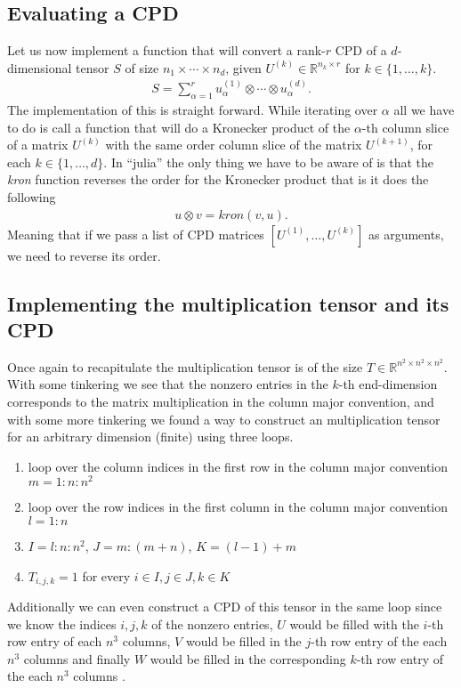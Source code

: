 \documentclass[a4paper]{article}
\begin{document}
\subsection{Evaluating a CPD}
Let us now implement a function that will convert a rank-$r$ CPD of a
$d$-dimensional tensor $S$ of size $n_1 \times \cdots \times n_d$, given
$U^{(k)} \in \mathbb{R}^{n_k\times r}$ for $k\in \{1, \dots, k\}$.
\begin{align}
    S = \sum_{\alpha=1}^r u_\alpha^{(1)} \otimes \cdots \otimes
    u_\alpha^{(d)}.
\end{align}
The implementation of this is straight forward. While iterating over $\alpha$
all we have to do is call a function that will do a Kronecker product of the
$\alpha$-th column slice of a matrix $U^{(k)}$ with  the same order column
slice of the matrix $U^{(k+1)}$, for each $k \in \{1,\dots, d\}$. In
``julia'' the only thing we have to be aware of is that the \textit{kron}
function reverses the order for the Kronecker product that is it does the
following
\begin{align}
        u \otimes v = \textit{kron}(v, u).
\end{align}
Meaning that if we pass a list of CPD matrices $[U^{(1)}, \dots, U^{(k)}]$ as
arguments, we need to reverse its order\cite{code}.
\subsection{Implementing the multiplication tensor and its CPD}
Once again to recapitulate the multiplication tensor is of the size $T \in
\mathbb{R}^{n^2\times n^2 \times n^2}$. With some tinkering we see that the
nonzero entries in the $k$-th end-dimension corresponds to the matrix
multiplication in the column major convention, and with some more tinkering
we found a way to construct an multiplication tensor for an arbitrary
dimension (finite) using three loops.
\begin{enumerate}
    \item loop over the column indices in the first row in the column major
        convention $m=1:n:n^2$
    \item loop over the row indices in the first column in the column major
        convention $l=1:n$
    \item $I = l:n:n^2$, $J = m:(m+n)$, $K = (l-1)+m$
    \item $T_{i, j, k} = 1$ for every $i\in I, j\in J,k \in K$
\end{enumerate}
Additionally we can even construct a CPD of this tensor in the same loop
since we know the indices $i, j, k$ of the nonzero entries, $U$ would be
filled with the $i$-th row entry of each $n^3$ columns, $V$ would be filled
in the $j$-th row entry of the each $n^3$ columns and finally $W$ would be
filled in the corresponding $k$-th row entry of the each $n^3$ columns
\cite{code}.
\end{document}
